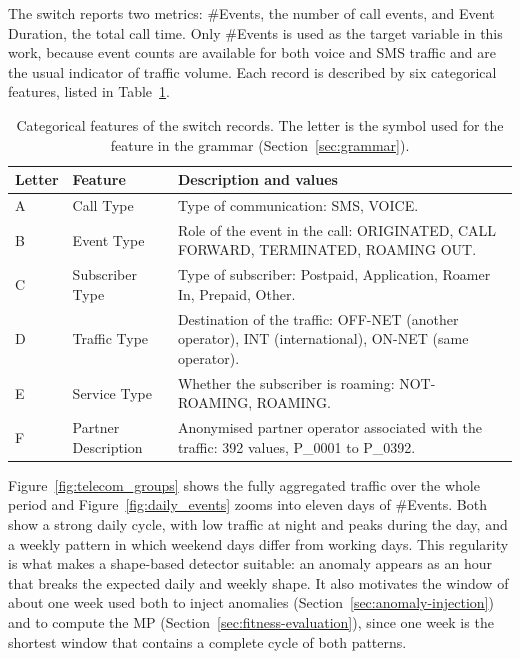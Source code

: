 The switch reports two metrics: \#Events, the number of call events, and Event Duration, the total call time.
Only \#Events is used as the target variable in this work, because event counts are available for both voice and SMS traffic and are the usual indicator of traffic volume.
Each record is described by six categorical features, listed in Table~\ref{tab:cdr_fields}.

\begin{table}[H]
    \centering
    \caption[Categorical features of the switch records]{Categorical features of the switch records. The letter is the symbol used for the feature in the grammar (Section~\ref{sec:grammar}).}
    \label{tab:cdr_fields}
    \begin{tabularx}{\textwidth}{llX}
        \toprule
        Letter & Feature & Description and values \\
        \midrule
        A & Call Type & Type of communication: SMS, VOICE. \\
        B & Event Type & Role of the event in the call: ORIGINATED, CALL FORWARD, TERMINATED, ROAMING OUT. \\
        C & Subscriber Type & Type of subscriber: Postpaid, Application, Roamer In, Prepaid, Other. \\
        D & Traffic Type & Destination of the traffic: OFF-NET (another operator), INT (international), ON-NET (same operator). \\
        E & Service Type & Whether the subscriber is roaming: NOT-ROAMING, ROAMING. \\
        F & Partner Description & Anonymised partner operator associated with the traffic: 392 values, P\_0001 to P\_0392. \\
        \bottomrule
    \end{tabularx}
\end{table}

Figure~\ref{fig:telecom_groups} shows the fully aggregated traffic over the whole period and Figure~\ref{fig:daily_events} zooms into eleven days of \#Events.
Both show a strong daily cycle, with low traffic at night and peaks during the day, and a weekly pattern in which weekend days differ from working days.
This regularity is what makes a shape-based detector suitable: an anomaly appears as an hour that breaks the expected daily and weekly shape.
It also motivates the window of about one week used both to inject anomalies (Section~\ref{sec:anomaly-injection}) and to compute the \ac{MP} (Section~\ref{sec:fitness-evaluation}), since one week is the shortest window that contains a complete cycle of both patterns.

